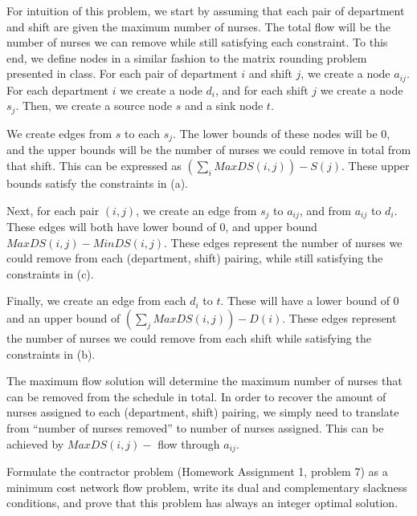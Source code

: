 \documentclass[fleqn]{homework}
\begin{document}
\begin{problem}{1}
    For intuition of this problem, we start by assuming that each pair of
    department and shift are given the maximum number of nurses.  The total flow
    will be the number of nurses we can remove while still satisfying each
    constraint.  To this end, we define nodes in a similar fashion to the matrix
    rounding problem presented in class.  For each pair of department $i$ and
    shift $j$, we create a node $a_{ij}$.  For each department $i$ we create a
    node $d_i$, and for each shift $j$ we create a node $s_j$.  Then, we create
    a source node $s$ and a sink node $t$.

    We create edges from $s$ to each $s_j$.  The lower bounds of these nodes
    will be 0, and the upper bounds will be the number of nurses we could remove
    in total from that shift.  This can be expressed as
    $\left(\sum_i MaxDS(i,j)\right) - S(j)$.  These upper bounds satisfy the
    constraints in (a).

    Next, for each pair $(i,j)$, we create an edge from $s_j$ to $a_{ij}$, and
    from $a_{ij}$ to $d_i$.  These edges will both have lower bound of 0, and
    upper bound $MaxDS(i,j) - MinDS(i,j)$.  These edges represent the number of
    nurses we could remove from each (department, shift) pairing, while still
    satisfying the constraints in (c).

    Finally, we create an edge from each $d_i$ to $t$.  These will have a lower
    bound of 0 and an upper bound of $\left(\sum_j MaxDS(i,j)\right) - D(i)$.
    These edges represent the number of nurses we could remove from each shift
    while satisfying the constraints in (b).

    The maximum flow solution will determine the maximum number of nurses that
    can be removed from the schedule in total.  In order to recover the amount
    of nurses assigned to each (department, shift) pairing, we simply need to
    translate from ``number of nurses removed'' to number of nurses assigned.
    This can be achieved by $MaxDS(i,j) -$ flow through $a_{ij}$.
  \end{problem}

  \begin{problem}{2}
    \begin{question}
      Formulate the contractor problem (Homework Assignment 1, problem 7) as a
      minimum cost network ﬂow problem, write its dual and complementary
      slackness conditions, and prove that this problem has always an integer
      optimal solution.
    \end{question}
  \end{problem}
\end{document}
